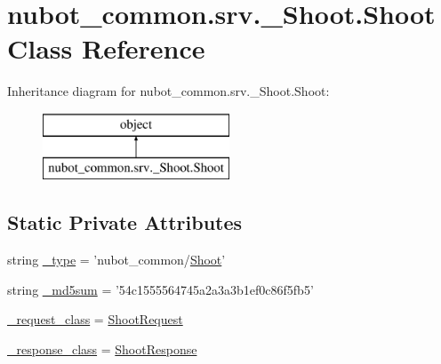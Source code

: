 \hypertarget{classnubot__common_1_1srv_1_1__Shoot_1_1Shoot}{\section{nubot\-\_\-common.\-srv.\-\_\-\-Shoot.\-Shoot Class Reference}
\label{classnubot__common_1_1srv_1_1__Shoot_1_1Shoot}
}
Inheritance diagram for nubot\-\_\-common.\-srv.\-\_\-\-Shoot.\-Shoot\-:\begin{figure}[H]
\begin{center}
\leavevmode
\includegraphics[height=2.000000cm]{classnubot__common_1_1srv_1_1__Shoot_1_1Shoot}
\end{center}
\end{figure}
\subsection*{Static Private Attributes}
\begin{DoxyCompactItemize}
\item 
string \hyperlink{classnubot__common_1_1srv_1_1__Shoot_1_1Shoot_a3498f426a18fa1843afc111ed73c1fc4}{\-\_\-type} = 'nubot\-\_\-common/\hyperlink{classnubot__common_1_1srv_1_1__Shoot_1_1Shoot}{Shoot}'
\item 
string \hyperlink{classnubot__common_1_1srv_1_1__Shoot_1_1Shoot_a45679daf31006d32eec8734c98cde194}{\-\_\-md5sum} = '54c1555564745a2a3a3b1ef0c86f5fb5'
\item 
\hyperlink{classnubot__common_1_1srv_1_1__Shoot_1_1Shoot_a2d7cc6e1160ada3219b5d44d949f3b9e}{\-\_\-request\-\_\-class} = \hyperlink{classnubot__common_1_1srv_1_1__Shoot_1_1ShootRequest}{Shoot\-Request}
\item 
\hyperlink{classnubot__common_1_1srv_1_1__Shoot_1_1Shoot_aa6067318f93cd1f857113677a0bcb44c}{\-\_\-response\-\_\-class} = \hyperlink{classnubot__common_1_1srv_1_1__Shoot_1_1ShootResponse}{Shoot\-Response}
\end{DoxyCompactItemize}


